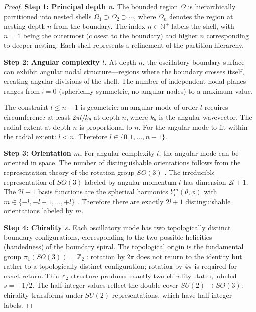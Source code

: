 \documentclass[11pt,a4paper]{article}
\theoremstyle{definition}
\theoremstyle{remark}
\newcommand{\Natural}{\mathbb{N}}
\newcommand{\Integer}{\mathbb{Z}}
\begin{document}
\begin{proof}
\textbf{Step 1: Principal depth $n$.} The bounded region $\Omega$ is hierarchically partitioned into nested shells $\Omega_1 \supset \Omega_2 \supset \cdots$, where $\Omega_n$ denotes the region at nesting depth $n$ from the boundary. The index $n \in \Natural^+$ labels the shell, with $n = 1$ being the outermost (closest to the boundary) and higher $n$ corresponding to deeper nesting. Each shell represents a refinement of the partition hierarchy.

\textbf{Step 2: Angular complexity $l$.} At depth $n$, the oscillatory boundary surface can exhibit angular nodal structure---regions where the boundary crosses itself, creating angular divisions of the shell. The number of independent nodal planes ranges from $l = 0$ (spherically symmetric, no angular nodes) to a maximum value.

The constraint $l \leq n - 1$ is geometric: an angular mode of order $l$ requires circumference at least $2\pi l / k_\theta$ at depth $n$, where $k_\theta$ is the angular wavevector. The radial extent at depth $n$ is proportional to $n$. For the angular mode to fit within the radial extent: $l < n$. Therefore $l \in \{0, 1, \ldots, n-1\}$.

\textbf{Step 3: Orientation $m$.} For angular complexity $l$, the angular mode can be oriented in space. The number of distinguishable orientations follows from the representation theory of the rotation group $SO(3)$ \citep{hall2015, wigner1959}. The irreducible representation of $SO(3)$ labeled by angular momentum $l$ has dimension $2l + 1$. The $2l + 1$ basis functions are the spherical harmonics $Y_l^m(\theta, \phi)$ with $m \in \{-l, -l+1, \ldots, +l\}$ \citep{griffiths2018}. Therefore there are exactly $2l + 1$ distinguishable orientations labeled by $m$.

\textbf{Step 4: Chirality $s$.} Each oscillatory mode has two topologically distinct boundary configurations, corresponding to the two possible helicities (handedness) of the boundary spiral. The topological origin is the fundamental group $\pi_1(SO(3)) = \Integer_2$ \citep{nakahara2003}: rotation by $2\pi$ does not return to the identity but rather to a topologically distinct configuration; rotation by $4\pi$ is required for exact return. This $\Integer_2$ structure produces exactly two chirality states, labeled $s = \pm 1/2$. The half-integer values reflect the double cover $SU(2) \to SO(3)$: chirality transforms under $SU(2)$ representations, which have half-integer labels.
\end{proof}
\end{document}
